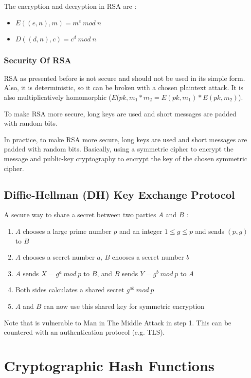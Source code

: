 The encryption and decryption in RSA are :
\begin{itemize}
    \item $E((e, n), m) = m^e\ mod\ n$
    \item $D((d, n), c) = c^d\ mod\ n$
\end{itemize}

\subsubsection{Security Of RSA}

RSA as presented before is not secure and should not be used in its simple form. Also, it is deterministic, so it can be broken with a chosen plaintext attack. It is also multiplicatively homomorphic ($E(pk, m_1 * m_2 = E(pk, m_1) * E(pk, m_2)$).

To make RSA more secure, long keys are used and short messages are padded with random bits.

In practice, to make RSA more secure,  long keys are used and short messages are padded with random bits. Basically, using a symmetric cipher to encrypt the message and public-key cryptography to encrypt the key of the chosen symmetric cipher.


\subsection{Diffie-Hellman (DH) Key Exchange Protocol}

A secure way to share a secret between two parties $A$ and $B$ :
\begin{enumerate}
    \item $A$ chooses a large prime number $p$ and an integer $1 \leq g \leq p$ and sends $(p, g)$ to $B$
    \item $A$ chooses a secret number $a$, $B$ chooses a secret number $b$
    \item $A$ sends $X = g^a\ mod\ p$ to $B$, and $B$ sends $Y = g^b\ mod\ p$ to $A$
    \item Both sides calculates a shared secret $g^{ab}\ mod\ p$
    \item $A$ and $B$ can now use this shared key for symmetric encryption
\end{enumerate}

Note that is vulnerable to Man in The Middle Attack in step 1. This can be countered with an authentication protocol (e.g. TLS).

\section{Cryptographic Hash Functions}

